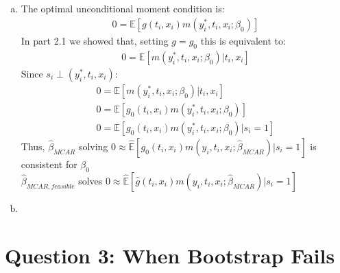 \documentclass[11pt]{article}
\begin{document}
\subsection{}
\begin{enumerate}[(a)]
	\item The optimal unconditional moment condition is:
	\begin{align*}
	0 = \mathbb{E}[g(t_i, x_i)m(y_i^*, t_i, x_i; \beta_0)]
	\end{align*}
	In part 2.1 we showed that, setting $g=g_0$ this is equivalent to:
	\begin{align*}
	0 = \mathbb{E}[m(y_i^*, t_i, x_i; \beta_0)|t_i,x_i]
	\end{align*}
	Since $s_i  \perp (y_i^*,t_i,x_i)$:
	\begin{align*}
	0 = \mathbb{E}[m(y_i^*, t_i, x_i; \beta_0)|t_i,x_i]\\
	0 = \mathbb{E}[g_0(t_i, x_i)m(y_i^*, t_i, x_i; \beta_0)]\\
	0 = \mathbb{E}[g_0(t_i, x_i)m(y_i^*, t_i, x_i; \beta_0) | s_i=1]
	\end{align*}
	Thus, $\hat{\beta}_{MCAR}$ solving $0 \approx \hat{\mathbb{E}}[g_0(t_i,x_i)m(y_i, t_i, x_i; \hat{\beta}_{MCAR})|s_i=1]$ is consistent for $\beta_0$\\
	$\hat{\beta}_{MCAR,feasible}$ solves $0 \approx \hat{\mathbb{E}}[\hat{g}(t_i,x_i)m(y_i, t_i, x_i; \hat{\beta}_{MCAR})|s_i=1]$
	\item
\end{enumerate}
\section{Question 3: When Bootstrap Fails}
\end{document}
